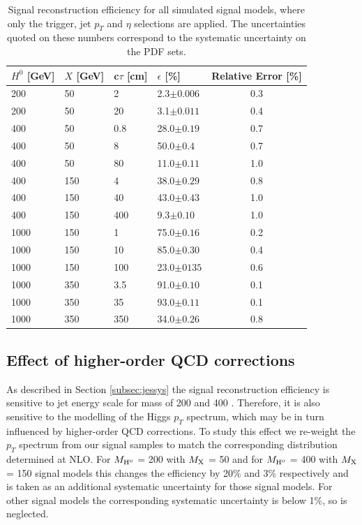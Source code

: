\begin{table}[htbp]
\centering
\caption{Signal reconstruction efficiency for all simulated signal models, where only  the trigger, jet $p_T$ and 
$\eta$ selections are applied. The uncertainties quoted on these numbers correspond to the systematic uncertainty on the PDF sets.\label{tab:pdfsys}}
\begin{tabular}{llllc}
$H^{0}$ [GeV] & $X$ [GeV] & c$\tau$ [cm] & $\epsilon$ [\%] &  Relative Error [\%] \\
\hline
\hline
200 & 50 & 2 & 2.3$\pm0.006$ & 0.3 \\
200 & 50 & 20 & 3.1$\pm0.011$ & 0.4 \\
\hline
400 & 50 & 0.8 & 28.0$\pm0.19$ & 0.7 \\
400 & 50 & 8 & 50.0$\pm0.4$ & 0.7 \\
400 & 50 & 80 & 11.0$\pm0.11$ & 1.0 \\
\hline
400 & 150 & 4 & 38.0$\pm0.29$ & 0.8 \\
400 & 150 & 40 & 43.0$\pm0.43$ & 1.0 \\
400 & 150 & 400 & 9.3$\pm0.10$ & 1.0 \\
\hline
1000 & 150 & 1 & 75.0$\pm0.16$ & 0.2 \\
1000 & 150 & 10 & 85.0$\pm0.30$ & 0.4 \\
1000 & 150 & 100 & 23.0$\pm0135$ & 0.6\\
\hline
1000 & 350 & 3.5 & 91.0$\pm0.10$ & 0.1 \\
1000 & 350 & 35 & 93.0$\pm0.11$ & 0.1 \\
1000 & 350 & 350 & 34.0$\pm0.26$ & 0.8 \\
\hline
\end{tabular}
\end{table}

\subsection{Effect of higher-order QCD corrections}
\label{subsec:isr}

As described in Section \ref{subsec:jessys} the signal reconstruction efficiency is sensitive to jet energy
scale for \Higgs mass of 200 \GeVcc and 400 \GeVcc. Therefore, it is also sensitive to the modelling of
 the Higgs $p_T$ spectrum, which may be in turn influenced by higher-order QCD corrections. To study this effect
we re-weight the \PYTHIA \Higgs $p_T$ spectrum from our signal samples to match the corresponding distribution
determined at NLO. For $M_{\mathrm{H}^{0}}$ = 200 \GeVcc with $M_{\mathrm{X}}$ = 50 \GeVcc and for $M_{\mathrm{H}^{0}}$ = 400 \GeVcc 
with $M_{\mathrm{X}}$ = 150 \GeVcc signal models this changes the efficiency by 20\% and 3\% respectively
and is taken as an additional systematic uncertainty for those signal models.
For other signal models the corresponding systematic uncertainty is below 1\%, so is neglected.   

